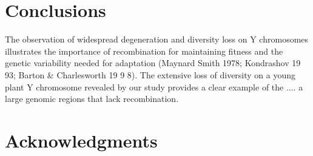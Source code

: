 \documentclass[9pt,twocolumn,twoside]{gsajnl}
\begin{document}



\section*{Conclusions}

The observation of widespread degeneration and diversity loss on Y chromosomes illustrates the importance of recombination for maintaining fitness and the genetic variability needed for adaptation (Maynard Smith 1978; Kondrashov 19 93; Barton & Charlesworth 19 9 8). The extensive loss of diversity on a young plant Y chromosome revealed by our study provides a clear example of the .... a large genomic regions that lack recombination.

\section*{Acknowledgments}



\end{document}
